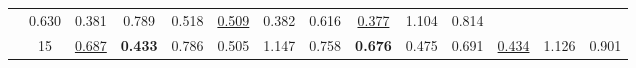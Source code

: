 \begin{table*}[t]
\begin{tabular}{c|c|cc|cc|cc|cc|cc|cc}
        & 0.630 & 0.381  %
        & 0.789 & 0.518  %
        & \underline{0.509} & 0.382  %
        & 0.616 & \underline{0.377}  %
        & 1.104 & 0.814  %
        \\
                & 15
        & \underline{0.687} & \textbf{0.433}  %
        & 0.786 & 0.505  %
        & 1.147 & 0.758  %
        & \textbf{0.676} & 0.475  %
        & 0.691 & \underline{0.434}  %
        & 1.126 & 0.901  %
        \\
        \bottomrule
    \end{tabular}
    \label{table:forecasting_accuracy}
    \vspace{-1.1em}
\end{table*}
